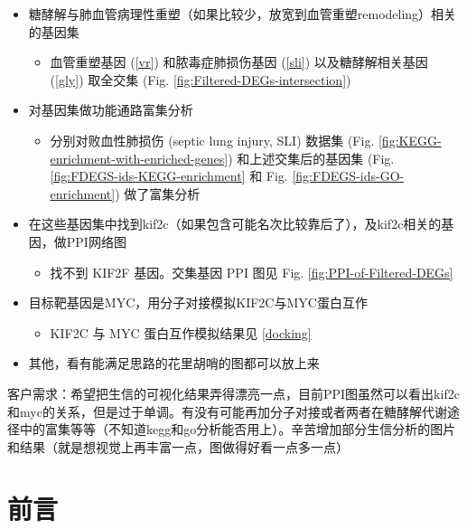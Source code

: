 \documentclass[
]{article}
\providecommand{\tightlist}{%
  \setlength{\itemsep}{0pt}\setlength{\parskip}{0pt}}
\begin{document}
\begin{itemize}
\tightlist
\item
  糖酵解与肺血管病理性重塑（如果比较少，放宽到血管重塑remodeling）相关的基因集

  \begin{itemize}
  \tightlist
  \item
    血管重塑基因 (\ref{vr}) 和脓毒症肺损伤基因 (\ref{sli}) 以及糖酵解相关基因 (\ref{gly}) 取全交集 (Fig. \ref{fig:Filtered-DEGs-intersection})
  \end{itemize}
\item
  对基因集做功能通路富集分析

  \begin{itemize}
  \tightlist
  \item
    分别对败血性肺损伤 (septic lung injury, SLI) 数据集 (Fig. \ref{fig:KEGG-enrichment-with-enriched-genes}) 和上述交集后的基因集 (Fig. \ref{fig:FDEGS-ids-KEGG-enrichment} 和 Fig. \ref{fig:FDEGS-ids-GO-enrichment}) 做了富集分析
  \end{itemize}
\item
  在这些基因集中找到kif2c（如果包含可能名次比较靠后了），及kif2c相关的基因，做PPI网络图

  \begin{itemize}
  \tightlist
  \item
    找不到 KIF2F 基因。交集基因 PPI 图见 Fig. \ref{fig:PPI-of-Filtered-DEGs}
  \end{itemize}
\item
  目标靶基因是MYC，用分子对接模拟KIF2C与MYC蛋白互作

  \begin{itemize}
  \tightlist
  \item
    KIF2C 与 MYC 蛋白互作模拟结果见 \ref{docking}
  \end{itemize}
\item
  其他，看有能满足思路的花里胡哨的图都可以放上来
\end{itemize}

客户需求：希望把生信的可视化结果弄得漂亮一点，目前PPI图虽然可以看出kif2c和myc的关系，但是过于单调。有没有可能再加分子对接或者两者在糖酵解代谢途径中的富集等等（不知道kegg和go分析能否用上）。辛苦增加部分生信分析的图片和结果（就是想视觉上再丰富一点，图做得好看一点多一点）

\hypertarget{introduction}{%
\section{前言}\label{introduction}}
\end{document}

